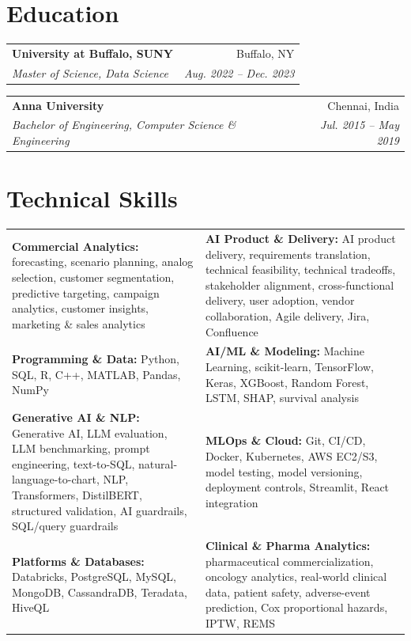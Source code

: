\documentclass[10pt,letterpaper]{article}
\makeatletter
\newcommand{\job}[4]{%
  \begin{tabularx}{\textwidth}{@{}Xr@{}}
    \textbf{#1} & #2 \\
    \textit{#3} & \textit{#4}
  \end{tabularx}\vspace{-2pt}
}
\makeatother
\begin{document}
\section{Education}
\job{University at Buffalo, SUNY}{Buffalo, NY}{Master of Science, Data Science}{Aug. 2022 -- Dec. 2023}
\job{Anna University}{Chennai, India}{Bachelor of Engineering, Computer Science \& Engineering}{Jul. 2015 -- May 2019}
\vspace{-3pt}

\section{Technical Skills}
{\small
\begin{tabularx}{\textwidth}{@{}>{\raggedright\arraybackslash}p{}@{\hspace{0.02\textwidth}}>{\raggedright\arraybackslash}p{}@{}}
\textbf{Commercial Analytics:} forecasting, scenario planning, analog selection, customer segmentation, predictive targeting, campaign analytics, customer insights, marketing \& sales analytics & \textbf{AI Product \& Delivery:} AI product delivery, requirements translation, technical feasibility, technical tradeoffs, stakeholder alignment, cross-functional delivery, user adoption, vendor collaboration, Agile delivery, Jira, Confluence \\
\textbf{Programming \& Data:} Python, SQL, R, C++, MATLAB, Pandas, NumPy & \textbf{AI/ML \& Modeling:} Machine Learning, scikit-learn, TensorFlow, Keras, XGBoost, Random Forest, LSTM, SHAP, survival analysis \\
\textbf{Generative AI \& NLP:} Generative AI, LLM evaluation, LLM benchmarking, prompt engineering, text-to-SQL, natural-language-to-chart, NLP, Transformers, DistilBERT, structured validation, AI guardrails, SQL/query guardrails & \textbf{MLOps \& Cloud:} Git, CI/CD, Docker, Kubernetes, AWS EC2/S3, model testing, model versioning, deployment controls, Streamlit, React integration \\
\textbf{Platforms \& Databases:} Databricks, PostgreSQL, MySQL, MongoDB, CassandraDB, Teradata, HiveQL & \textbf{Clinical \& Pharma Analytics:} pharmaceutical commercialization, oncology analytics, real-world clinical data, patient safety, adverse-event prediction, Cox proportional hazards, IPTW, REMS
\end{tabularx}}
\end{document}
